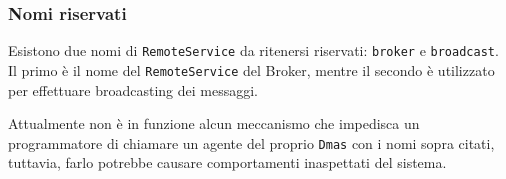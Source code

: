 \subsubsection{Nomi riservati}
Esistono due nomi di \texttt{RemoteService} da ritenersi riservati: \texttt{broker} e \texttt{broadcast}. Il primo è il nome del \texttt{RemoteService} del Broker, mentre il secondo è utilizzato 
per effettuare broadcasting dei messaggi.

Attualmente non è in funzione alcun meccanismo che impedisca un programmatore di chiamare un agente del proprio \texttt{Dmas} con i nomi sopra citati, tuttavia, farlo potrebbe causare comportamenti
inaspettati del sistema.